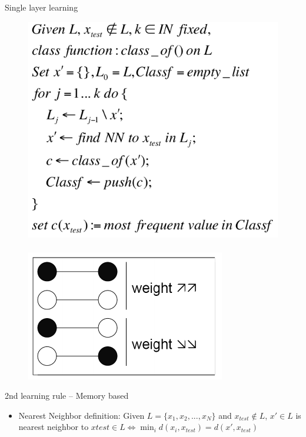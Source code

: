 \documentclass[9pt,t]{beamer}
\begin{document}
\begin{frame}{Single layer learning}
    \begin{figure}
        \centering
        \includegraphics[width=\linewidth]{../images/knn_algorithm.png} \\\hfill\\
        \includegraphics[width=0.8\linewidth]{../images/hebbs.png}
    \end{figure}
    \begin{alertblock}{2nd learning rule -- Memory based}
        \begin{itemize}
            \item Nearest Neighbor definition: Given $ L = \{x_1, x_2,...,x_N\} $ and $ x_{test} \notin L $, $ x' \in L $ is nearest neighbor to $ x{test} \in L \iff \min_i d(x_i, x_{test}) = d(x', x_{test}) $

\end{itemize}
\end{alertblock}
\end{frame}
\end{document}

